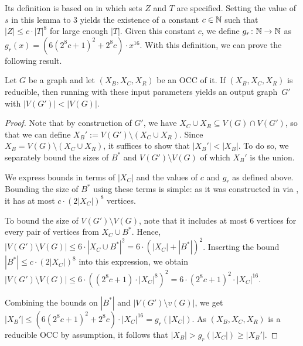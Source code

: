Its definition is based on  in which sets $Z$ and $T$ are specified. Setting the value of $s$ in this lemma to $3$ yields the existence of a constant $c \in \mathbb{N}$ such that $|Z| \leq c \cdot |T|^{8}$ for large enough $|T|$. Given this constant $c$, we define $g_r \colon \mathbb{N} \to \mathbb{N}$ as $g_r(x) = (6(2^8 c+1)^2+2^8 c) \cdot x^{16}$. With this definition, we can prove the following result. 
\begin{lemma} \label{lem:shrink:size}
	Let $G$ be a graph and let $(X_B, X_C, X_R)$ be an OCC of it. If $(X_B, X_C, X_R)$ is reducible, then running  with these input parameters yields an output graph~$G'$ with $|V(G')| < |V(G)|$.
\end{lemma}
\begin{proof}
	Note that by construction of $G'$, we have $X_C \cup X_R \subseteq V(G) \cap V(G')$, so that we can define $X_B' := V(G') \setminus (X_C \cup X_R)$. Since $X_B = V(G) \setminus (X_C \cup X_R)$, it suffices to show that $|X_B'| < |X_B|$. To do so, we separately bound the sizes of $B^\ast$ and $V(G') \setminus V(G)$ of which $X_B'$ is the union. 
	
	We express bounds in terms of $|X_C|$ and the values of $c$ and $g_r$ as defined above. Bounding the size of $B^\ast$ using these terms is simple: as it was constructed in  via , it has at most $c \cdot (2 |X_C|)^8$ vertices.
	
	To bound the size of $V(G') \setminus V(G)$, note that it includes at most $6$ vertices for every pair of vertices from $X_C \cup B^\ast$. Hence, $|V(G') \setminus V(G)| \leq 6 \cdot |X_C \cup B^\ast|^2 = 6 \cdot (|X_C| + |B^\ast|)^2$. Inserting the bound $|B^\ast| \leq c \cdot (2 |X_C|)^8$ into this expression, we obtain $|V(G') \setminus V(G)| \leq 6 \cdot \left((2^8 c+1) \cdot |X_C|^8 \right)^2 = 6 \cdot (2^8 c+1)^2 \cdot |X_C|^{16}$.
	
	Combining the bounds on $|B^\ast|$ and $|V(G') \setminus v(G)|$, we get $|X_B'| \leq \left(6(2^8 c+1)^2+2^8 c\right) \cdot |X_C|^{16} = g_r(|X_C|)$. As $(X_B, X_C, X_R)$ is a reducible OCC by assumption, it follows that $|X_B| > g_r(|X_C|) \geq |X_B'|$.
\end{proof}
